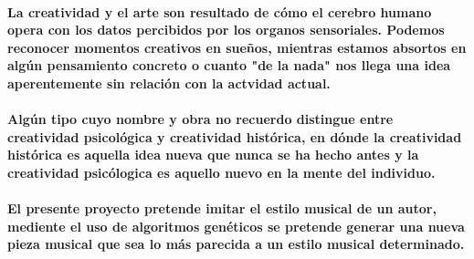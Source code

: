 \paragraph{La creatividad y el arte son resultado de cómo el cerebro humano opera con los datos percibidos por los organos sensoriales. Podemos reconocer momentos creativos en sueños, mientras estamos absortos en algún pensamiento concreto o cuanto "de la nada" nos llega una idea aperentemente sin relación con la actvidad actual.}

\paragraph{Algún tipo cuyo nombre y obra no recuerdo\cite{required} distingue entre creatividad psicológica y creatividad histórica, en dónde la creatividad histórica es aquella idea nueva que nunca se ha hecho antes y la creatividad psicólogica es aquello nuevo en la mente del individuo.}


\paragraph{El presente proyecto pretende imitar el estilo musical de un autor, mediente el uso de algoritmos genéticos se pretende generar una nueva pieza musical que sea lo más parecida a un estilo musical determinado.}
